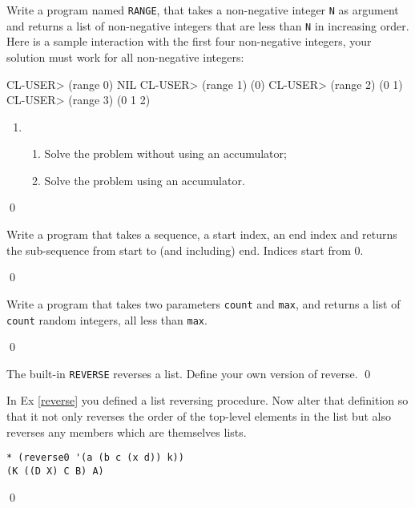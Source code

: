 \documentclass[a4paper,11pt]{article}
\begin{document}
\begin{uexercise}[*]
Write a program named \Verb+RANGE+, that takes a non-negative integer
\Verb+N+ as argument and returns a list of non-negative integers that
are less than \Verb+N+ in increasing order.  Here is a sample
interaction with the first four non-negative integers, your solution
must work for all non-negative integers: 

\begin{lispcode}
CL-USER> (range 0)
NIL
CL-USER> (range 1)
(0)
CL-USER> (range 2)
(0 1)
CL-USER> (range 3)
(0 1 2)
\end{lispcode}

\begin{enumerate}
\item[]
	\begin{enumerate}
	\item Solve the problem without using an accumulator;
	\item Solve the problem using an accumulator.
	\end{enumerate}
\end{enumerate}
\qed
\end{uexercise}

\begin{uexercise}[*]
Write a program that takes a sequence, a start index, an end index
and returns the sub-sequence from start to (and including) end.
Indices start from 0.

\qed
\end{uexercise}

\begin{uexercise}[*]
Write a program that takes two parameters \Verb+count+ and \Verb+max+,
and returns a list of \Verb+count+ random integers, all less than
\Verb+max+.

\qed
\end{uexercise}

\begin{uexercise}
\label{reverse}
The built-in \Verb+REVERSE+ reverses a list. Define your own version of reverse.
\qed
\end{uexercise}

\begin{uexercise}

In Ex \ref{reverse} you defined a list reversing procedure. Now alter that definition so that it  not only reverses the order of the top-level elements in the list but also reverses any members which are themselves lists.

{\small
\begin{Verbatim}
* (reverse0 '(a (b c (x d)) k))
(K ((D X) C B) A)
\end{Verbatim}
}
\qed
\end{uexercise}
\end{document}

